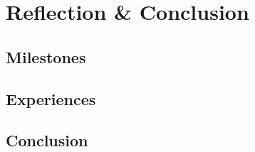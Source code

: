 \chapter{Reflection \& Conclusion}

\section{Milestones}

\section{Experiences}

\section{Conclusion}
